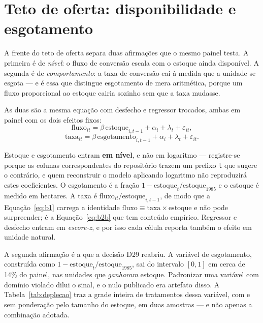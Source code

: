 \FloatBarrier

\section{Teto de oferta: disponibilidade e esgotamento}
\label{ap:oferta}

A frente do teto de oferta separa duas afirmações que o mesmo painel testa. A
primeira é de \emph{nível}: o fluxo de conversão escala com o estoque ainda
disponível. A segunda é de \emph{comportamento}: a taxa de conversão cai à
medida que a unidade se esgota --- e é essa que distingue esgotamento de mera
aritmética, porque um fluxo proporcional ao estoque cairia sozinho sem que a
taxa mudasse.

As duas são a mesma equação com desfecho e regressor trocados, ambas em painel
com os dois efeitos fixos:
\begin{equation}
\text{fluxo}_{it} = \beta\,\text{estoque}_{i,t-1}
                  + \alpha_i + \lambda_t + \varepsilon_{it},
\label{eq:b1}
\end{equation}
\begin{equation}
\text{taxa}_{it} = \beta\,\text{esgotamento}_{i,t-1}
                 + \alpha_i + \lambda_t + \varepsilon_{it}.
\label{eq:b2b}
\end{equation}

\noindent Estoque e esgotamento entram \textbf{em nível}, e não em logaritmo ---
registre-se porque as colunas correspondentes do repositório trazem um prefixo
\texttt{l} que sugere o contrário, e quem reconstruir o modelo aplicando
logaritmo não reproduzirá estes coeficientes. O esgotamento é a fração
\(1 - \text{estoque}_t/\text{estoque}_{1985}\) e o estoque é medido em hectares.
A taxa é \(\text{fluxo}_{it}/\text{estoque}_{i,t-1}\), de modo que a
Equação~\ref{eq:b1} carrega a identidade \(\text{fluxo} \equiv \text{taxa}
\times \text{estoque}\) e não pode surpreender; é a Equação~\ref{eq:b2b} que
tem conteúdo empírico. Regressor e desfecho entram em \emph{escore-z}, e por
isso cada célula reporta também o efeito em unidade natural.

A segunda afirmação é a que a decisão D29 reabriu. A variável de esgotamento,
construída como \(1 - \text{estoque}_t/\text{estoque}_{1985}\), sai do intervalo
\([0,1]\) em cerca de 14\% do painel, nas unidades que \emph{ganharam} estoque.
Padronizar uma variável com domínio violado dilui o sinal, e o nulo publicado
era artefato disso. A Tabela~\ref{tab:deplecao} traz a grade inteira de
tratamentos dessa variável, com e sem ponderação pelo tamanho do estoque, em
duas amostras --- e não apenas a combinação adotada.


